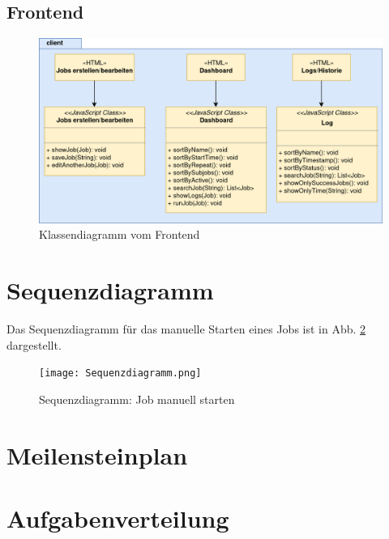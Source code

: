 \documentclass[a4paper,10pt]{article}
\begin{document}
\subsection{Frontend}
\begin{figure}[!htb]
	\centering
	\includegraphics[width=\textwidth]{KlassendiagrammFrontend.png}
	\caption{Klassendiagramm vom Frontend}
	\label{klassendiagrammFrontend}
\end{figure}

\section{Sequenzdiagramm}
Das Sequenzdiagramm für das manuelle Starten eines Jobs ist in Abb. \ref{seqStartJobManually} dargestellt.
\begin{figure}[!htb]
	\centering
	\texttt{[image: Sequenzdiagramm.png]}
	\caption{Sequenzdiagramm: Job manuell starten}
	\label{seqStartJobManually}
\end{figure}

\section{Meilensteinplan}


\section{Aufgabenverteilung}

\end{document}
